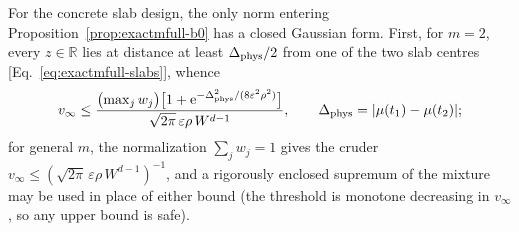 For the concrete slab design, the only norm entering
Proposition~\ref{prop:exactmfull-b0} has a closed Gaussian form.  First,
for \(m=2\), every \(z\in\mathbb R\) lies at distance at least
\(\Delta_{\rm phys}/2\) from one of the two slab centres
[Eq.~\eqref{eq:exactmfull-slabs}], whence
\begin{equation}
 v_\infty\le
 \frac{\bigl(\max_jw_j\bigr)
       \bigl[1+\mathrm e^{-\Delta_{\rm phys}^2/(8\varepsilon^2\rho^2)}\bigr]}
      {\sqrt{2\pi}\,\varepsilon\rho\,W^{d-1}},
 \qquad
 \Delta_{\rm phys}=|\mu(t_1)-\mu(t_2)|;
 \label{eq:exactmfull-b0-vinf}
\end{equation}
for general \(m\), the normalization \(\sum_jw_j=1\) gives the cruder
\(v_\infty\le(\sqrt{2\pi}\,\varepsilon\rho\,W^{d-1})^{-1}\), and a
rigorously enclosed supremum of the mixture may be used in place of either
bound (the threshold is monotone decreasing in \(v_\infty\), so any upper
bound is safe).

